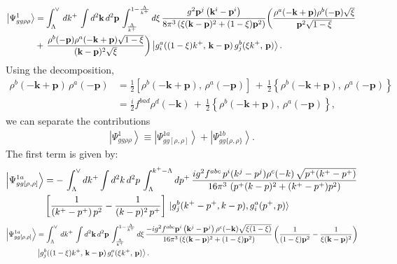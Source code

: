 \documentclass[aps,prd,amsmath,amssymb,nofootinbib]{revtex4-2}
\numberwithin{equation}{section}
\begin{document}
\begin{align}
\left|\Psi_{gg\rho\rho}^{1}\right\rangle &=\int_{\Lambda}^{\vee}\,dk^{+}\,\int d^{2}\mathbf{k}\, d^{2}\mathbf{p}\,\int_{\frac{\Lambda}{k^{+}}}^{1-\frac{\Lambda}{k^{+}}}d\xi\,\frac{g^{2}\mathbf{p}^{j}\left(\mathbf{k}^{i}-\mathbf{p}^{i}\right)}{8\pi^{3}\left(\xi(\mathbf{k}-\mathbf{p})^{2}+(1-\xi)\mathbf{p}^{2}\right)}\bigg(\frac{\rho^{a}(-\mathbf{k}+\mathbf{p})\rho^{b}(-\mathbf{p})\sqrt{\xi}}{\mathbf{p}^{2}\sqrt{1-\xi}}\,\notag \\ & +\,\frac{\rho^{b}(-\mathbf{p})\rho^{a}(-\mathbf{k}+\mathbf{p})\sqrt{1-\xi}}{(\mathbf{k}-\mathbf{p})^{2}\sqrt{\xi}}\bigg)\left|g_{i}^{a}((1-\xi)k^{+},\,\mathbf{k}-\mathbf{p})\,g_{j}^{b}(\xi k^{+},\,\mathbf{p})\right\rangle.
\end{align}
Using the decomposition,
\begin{align}\label{decomposition}
\rho^{b}(-\mathbf{k}+\mathbf{p})\,\rho^{a}(-\mathbf{p}) &= \frac{1}{2}\left[\rho^{b}(-\mathbf{k}+\mathbf{p}),\,\rho^{a}(-\mathbf{p})\right]\,+\,\frac{1}{2}\left\{ \rho^{b}(-\mathbf{k}+\mathbf{p}),\,\rho^{a}(-\mathbf{p})\right\} \\
&= \frac{i}{2}f^{bad}\rho^{d}(-\mathbf{k})\,+\,\frac{1}{2}\left\{ \rho^{b}(-\mathbf{k}+\mathbf{p}),\,\rho^{a}(-\mathbf{p})\right\}, 
\end{align}
we can separate the contributions
\begin{align}
\left|\Psi_{gg\rho\rho}^{1}\right\rangle \equiv \left|\Psi_{gg[\rho,\rho]}^{1a}\right\rangle + \left|\Psi_{gg\{\rho,\rho\}}^{1b}\right\rangle.
\end{align}
The first term is given by:
\begin{align}
    \left|\Psi_{gg[\rho,\rho]}^{1a}\right\rangle &= -\,\int_{\Lambda}^{\vee} dk^{+} \int d^{2}k\, d^{2}p\, \int_{\Lambda}^{k^{+}-\Lambda}dp^{+}\, \frac{ig^{2}f^{abc}\,p^{i}(k^{j}-p^{j})\rho^{c}(-k)\, \sqrt{p^{+}(k^{+}-p^{+})}}{16\pi^{3}\, \left(p^{+}(k-p)^{2}+(k^{+}-p^{+})p^{2}\right)}\notag \\ &  \left[\frac{1}{(k^{+}-p^{+})\,p^{2}} - \frac{1}{(k-p)^{2}\,p^{+}}\right]\, \ket{g^{b}_{j}(k^{+}-p^{+}, k-p),g^{a}_{i}(p^{+},p)}
\end{align}
\begin{align}\label{part 1}
\left|\Psi_{gg[\rho,\rho]}^{1a}\right\rangle &=\int_{\Lambda}^{\vee}\, dk^{+}\,\int d^{2}\mathbf{k}\, d^{2}\mathbf{p}\,\int_{\frac{\Lambda}{k^{+}}}^{1-\frac{\Lambda}{k^{+}}}d\xi\,\frac{-ig^{2}f^{abc}\mathbf{p}^{i}\left(\mathbf{k}^{j}-\mathbf{p}^{j}\right)\rho^{c}(-\mathbf{k})\sqrt{\xi(1-\xi)}}{16\pi^{3}\left(\xi(\mathbf{k}-\mathbf{p})^{2}+(1-\xi)\mathbf{p}^{2}\right)} \left(\frac{1}{(1-\xi)\mathbf{p}^{2}}-\frac{1}{\xi(\mathbf{k}-\mathbf{p})^{2}}\right)\notag \\ & \left|g_{j}^{b}((1-\xi)k^{+},\,\mathbf{k}-\mathbf{p})\,g_{i}^{a}(\xi k^{+},\,\mathbf{p})\right\rangle.
\end{align}
\end{document}
